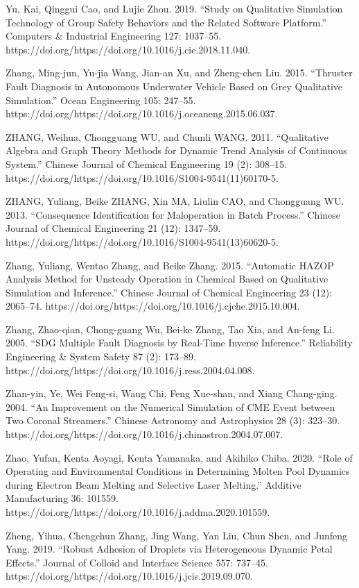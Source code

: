 \documentclass[utf8]{gradu3}
\begin{document}
Yu, Kai, Qinggui Cao, and Lujie Zhou. 2019. “Study on Qualitative Simulation Technology of Group Safety Behaviors and the Related Software Platform.” Computers \& Industrial Engineering 127: 1037–55. https://doi.org/https://doi.org/10.1016/j.cie.2018.11.040.

Zhang, Ming-jun, Yu-jia Wang, Jian-an Xu, and Zheng-chen Liu. 2015. “Thruster Fault Diagnosis in Autonomous Underwater Vehicle Based on Grey Qualitative Simulation.” Ocean Engineering 105: 247–55. https://doi.org/https://doi.org/10.1016/j.oceaneng.2015.06.037.

ZHANG, Weihua, Chongguang WU, and Chunli WANG. 2011. “Qualitative Algebra and Graph Theory Methods for Dynamic Trend Analysis of Continuous System.” Chinese Journal of Chemical Engineering 19 (2): 308–15. https://doi.org/https://doi.org/10.1016/S1004-9541(11)60170-5.

ZHANG, Yuliang, Beike ZHANG, Xin MA, Liulin CAO, and Chongguang WU. 2013. “Consequence Identification for Maloperation in Batch Process.” Chinese Journal of Chemical Engineering 21 (12): 1347–59. https://doi.org/https://doi.org/10.1016/S1004-9541(13)60620-5.

Zhang, Yuliang, Wentao Zhang, and Beike Zhang. 2015. “Automatic HAZOP Analysis Method for Unsteady Operation in Chemical Based on Qualitative Simulation and Inference.” Chinese Journal of Chemical Engineering 23 (12): 2065–74. https://doi.org/https://doi.org/10.1016/j.cjche.2015.10.004.

Zhang, Zhao-qian, Chong-guang Wu, Bei-ke Zhang, Tao Xia, and An-feng Li. 2005. “SDG Multiple Fault Diagnosis by Real-Time Inverse Inference.” Reliability Engineering \& System Safety 87 (2): 173–89. https://doi.org/https://doi.org/10.1016/j.ress.2004.04.008.

Zhan-yin, Ye, Wei Feng-si, Wang Chi, Feng Xue-shan, and Xiang Chang-ging. 2004. “An Improvement on the Numerical Simulation of CME Event between Two Coronal Streamers.” Chinese Astronomy and Astrophysics 28 (3): 323–30. https://doi.org/https://doi.org/10.1016/j.chinastron.2004.07.007.

Zhao, Yufan, Kenta Aoyagi, Kenta Yamanaka, and Akihiko Chiba. 2020. “Role of Operating and Environmental Conditions in Determining Molten Pool Dynamics during Electron Beam Melting and Selective Laser Melting.” Additive Manufacturing 36: 101559. https://doi.org/https://doi.org/10.1016/j.addma.2020.101559.

Zheng, Yihua, Chengchun Zhang, Jing Wang, Yan Liu, Chun Shen, and Junfeng Yang. 2019. “Robust Adhesion of Droplets via Heterogeneous Dynamic Petal Effects.” Journal of Colloid and Interface Science 557: 737–45. https://doi.org/https://doi.org/10.1016/j.jcis.2019.09.070.
\end{document}
